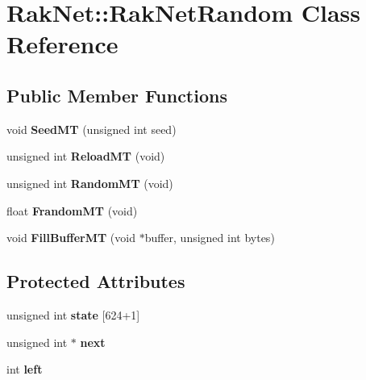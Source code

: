 \hypertarget{class_rak_net_1_1_rak_net_random}{\section{Rak\-Net\-:\-:Rak\-Net\-Random Class Reference}
\label{class_rak_net_1_1_rak_net_random}
}
\subsection*{Public Member Functions}
\begin{DoxyCompactItemize}
\item 
\hypertarget{class_rak_net_1_1_rak_net_random_aa9df7b6053fedf10feb8132589a210d1}{void {\bfseries Seed\-M\-T} (unsigned int seed)}\label{class_rak_net_1_1_rak_net_random_aa9df7b6053fedf10feb8132589a210d1}

\item 
\hypertarget{class_rak_net_1_1_rak_net_random_ab098f53f131ce9c8b702aa6dd18176d9}{unsigned int {\bfseries Reload\-M\-T} (void)}\label{class_rak_net_1_1_rak_net_random_ab098f53f131ce9c8b702aa6dd18176d9}

\item 
\hypertarget{class_rak_net_1_1_rak_net_random_a9352d2d5ac49ce632c67f56cb240e1f3}{unsigned int {\bfseries Random\-M\-T} (void)}\label{class_rak_net_1_1_rak_net_random_a9352d2d5ac49ce632c67f56cb240e1f3}

\item 
\hypertarget{class_rak_net_1_1_rak_net_random_aa428ae044d7324158dfd61b9fa5ab896}{float {\bfseries Frandom\-M\-T} (void)}\label{class_rak_net_1_1_rak_net_random_aa428ae044d7324158dfd61b9fa5ab896}

\item 
\hypertarget{class_rak_net_1_1_rak_net_random_afaf2647c432b7dbcecd304f4601e8696}{void {\bfseries Fill\-Buffer\-M\-T} (void $\ast$buffer, unsigned int bytes)}\label{class_rak_net_1_1_rak_net_random_afaf2647c432b7dbcecd304f4601e8696}

\end{DoxyCompactItemize}
\subsection*{Protected Attributes}
\begin{DoxyCompactItemize}
\item 
\hypertarget{class_rak_net_1_1_rak_net_random_a530c49473bd588bd7eb8769748e7c39d}{unsigned int {\bfseries state} \mbox{[}624+1\mbox{]}}\label{class_rak_net_1_1_rak_net_random_a530c49473bd588bd7eb8769748e7c39d}

\item 
\hypertarget{class_rak_net_1_1_rak_net_random_a9d2f9606a6e6c3949bac82a6aec60727}{unsigned int $\ast$ {\bfseries next}}\label{class_rak_net_1_1_rak_net_random_a9d2f9606a6e6c3949bac82a6aec60727}

\item 
\hypertarget{class_rak_net_1_1_rak_net_random_a446ddcb6a95db32b5d0cb578bd29a653}{int {\bfseries left}}\label{class_rak_net_1_1_rak_net_random_a446ddcb6a95db32b5d0cb578bd29a653}

\end{DoxyCompactItemize}


